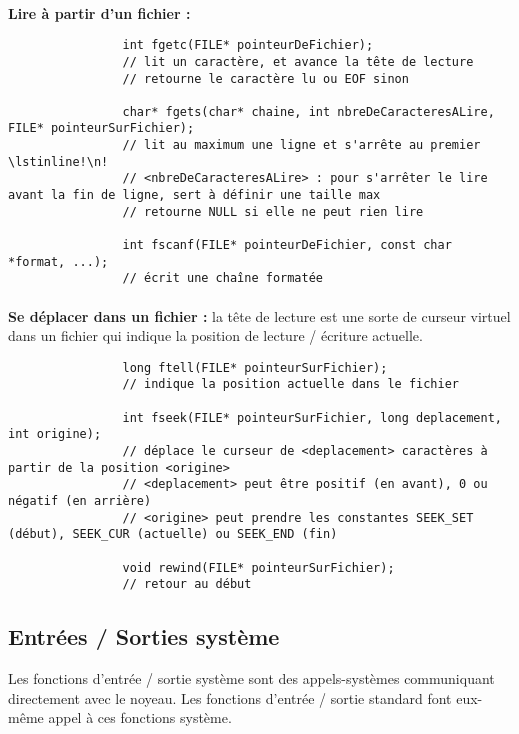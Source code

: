 		\noindent\paragraph{}\textbf{Lire à partir d'un fichier :}
		
			\begin{lstlisting}
				int fgetc(FILE* pointeurDeFichier);
				// lit un caractère, et avance la tête de lecture
				// retourne le caractère lu ou EOF sinon
				
				char* fgets(char* chaine, int nbreDeCaracteresALire, FILE* pointeurSurFichier);
				// lit au maximum une ligne et s'arrête au premier \lstinline!\n!
				// <nbreDeCaracteresALire> : pour s'arrêter le lire avant la fin de ligne, sert à définir une taille max
				// retourne NULL si elle ne peut rien lire
				
				int fscanf(FILE* pointeurDeFichier, const char *format, ...);
				// écrit une chaîne formatée
			\end{lstlisting}
			
		\noindent\paragraph{}\textbf{Se déplacer dans un fichier :} la tête de lecture est une sorte de curseur virtuel dans un fichier qui indique la position de lecture / écriture actuelle.
		
			\begin{lstlisting}
				long ftell(FILE* pointeurSurFichier);
				// indique la position actuelle dans le fichier
				
				int fseek(FILE* pointeurSurFichier, long deplacement, int origine);
				// déplace le curseur de <deplacement> caractères à partir de la position <origine>
				// <deplacement> peut être positif (en avant), 0 ou négatif (en arrière)
				// <origine> peut prendre les constantes SEEK_SET (début), SEEK_CUR (actuelle) ou SEEK_END (fin)
				
				void rewind(FILE* pointeurSurFichier);
				// retour au début
			\end{lstlisting}
			
		
	\subsection{Entrées / Sorties système}
		Les fonctions d'entrée / sortie système sont des appels-systèmes communiquant directement avec le noyeau. Les fonctions d'entrée / sortie standard font eux-même appel à ces fonctions système.
		
		
	
